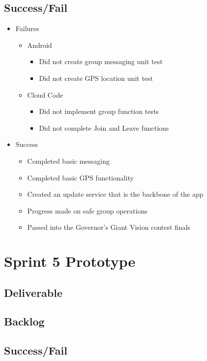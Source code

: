\subsection{Success/Fail}
\begin{itemize}
	\item Failures
	\begin{itemize}
		\item Android
		\begin{itemize}
			\item Did not create group messaging unit test
			\item Did not create GPS location unit test
		\end{itemize}
		\item Cloud Code
		\begin{itemize}
			\item Did not implement group function tests
			\item Did not complete Join and Leave functions
		\end{itemize}
	\end{itemize}
	\item Success
	\begin{itemize}
		\item Completed basic messaging
		\item Completed basic GPS functionality
		\item Created an update service that is the backbone of the app
		\item Progress made on safe group operations
		\item Passed into the Governor's Giant Vision contest finals
	\end{itemize}
\end{itemize}

\section{Sprint 5 Prototype}
\subsection{Deliverable}
\subsection{Backlog}
\subsection{Success/Fail}

